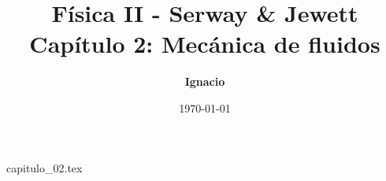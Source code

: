 \documentclass[11pt,spanish,oneside]{report}
\title{\textbf{Física II - Serway \& Jewett} \\ \Large Capítulo 2: Mecánica de fluidos}
\author{\textbf{Ignacio}}
\date{\today}
\begin{document}
\maketitle

{capitulo_02.tex}
\end{document}
